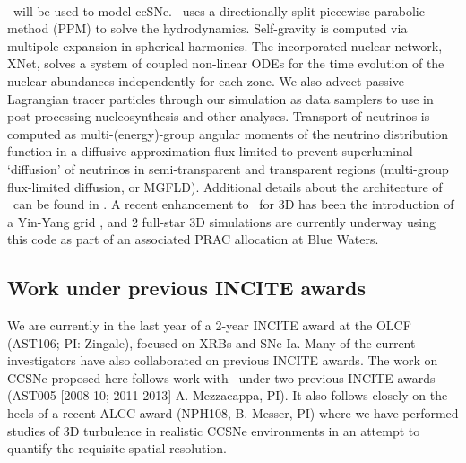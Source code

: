 \documentclass[11pt,letterpaper,english]{article}
\begin{document}
\paragraph{\chimera}
%
\chimera\ will be used to model ccSNe.  
\chimera\ uses a directionally-split piecewise parabolic method (PPM) to solve the hydrodynamics. Self-gravity is computed via multipole expansion in spherical harmonics.
The incorporated nuclear network, XNet, solves a system of coupled non-linear ODEs for the time evolution of the nuclear abundances independently for each zone. We also advect passive Lagrangian tracer particles through our simulation as data samplers to use in post-processing nucleosynthesis and other analyses. Transport of neutrinos is computed as multi-(energy)-group angular moments of the neutrino distribution function in a diffusive approximation flux-limited to prevent superluminal `diffusion' of neutrinos in semi-transparent and transparent regions (multi-group flux-limited diffusion, or MGFLD). 
Additional details about the architecture of \chimera\ can be found in \citep{brmehi09,Messeretal2012GPU}. A recent enhancement to \chimera\ for 3D has been the introduction of a Yin-Yang grid \citep{KageSato2004}, and 2 full-star 3D simulations are currently underway using this code as part of an associated PRAC allocation at Blue Waters. 

\subsection{Work under previous INCITE awards}

We are currently in the last year of a 2-year INCITE award at the OLCF
(AST106; PI: Zingale), focused on XRBs and SNe Ia.  Many of the
current investigators have also collaborated on previous INCITE
awards. 
The work on CCSNe proposed here follows work with \chimera\ under two previous INCITE awards (AST005 [2008-10; 2011-2013]  A. Mezzacappa, PI).  It also follows closely on the heels of a recent ALCC award (NPH108, B. Messer, PI) where we have performed studies 
of 3D turbulence in realistic CCSNe environments in an attempt to quantify the requisite spatial resolution. 
\end{document}
